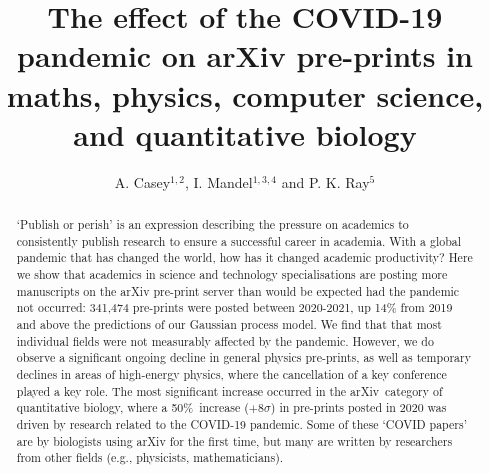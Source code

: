 \documentclass[]{rsos}%
\newcommand{\arxiv}{arXiv}
\newcommand{\change}[1]{#1}
\begin{document}
\title{\change{The effect of the COVID-19 pandemic on arXiv pre-prints in maths, physics, computer science, and quantitative biology}}


\author{%
{A. Casey$^{1,2}$,  I. Mandel$^{1,3,4}$ and P. K. Ray$^{5}$}}

\address{$^1$School of Physics \& Astronomy, Monash University, Clayton 3800, Victoria, Australia\\
$^2$ARC Centre of Excellence for Astrophysics in Three Dimensions (ASTRO-3D), Australia\\
$^3$OzGrav, Australian Research Council Centre of Excellence for Gravitational Wave Discovery, Australia\\
$^4$Institute of Gravitational Wave Astronomy and School of Physics and Astronomy, University of Birmingham, Birmingham, B15 2TT, United Kingdom\\
$^5$Department of Mathematics, Imperial College London, London, United Kingdom
}

\subject{xxxxx, xxxxx, xxxx}



\begin{abstract}
`Publish or perish’ is an expression describing the pressure on academics to consistently publish research to ensure a successful career in academia. 
With a global pandemic that has changed the world, how has it changed academic productivity? 
Here we show that academics \change{in science and technology specialisations} are posting more \change{manuscripts} on the arXiv pre-print server than would be expected had the pandemic not occurred: 341,474 pre-prints were posted between 2020-2021, up 14\% from 2019 and above the predictions of our Gaussian process model.
We find that that most individual fields were not measurably affected by the pandemic.
However, we do observe a significant ongoing decline in general physics pre-prints, as well as temporary declines in areas of high-energy physics, where the cancellation of a key conference played a key role.
The most significant increase occurred in \change{the \arxiv\ category of} quantitative biology, where a 50\%~increase ($+8\sigma$) in pre-prints posted in 2020 was driven by research related to the COVID-19 pandemic. 
Some of these `COVID papers' are by biologists using arXiv for the first time, but many are written by researchers from other fields (e.g., physicists, mathematicians).
\end{abstract}
\end{document}
